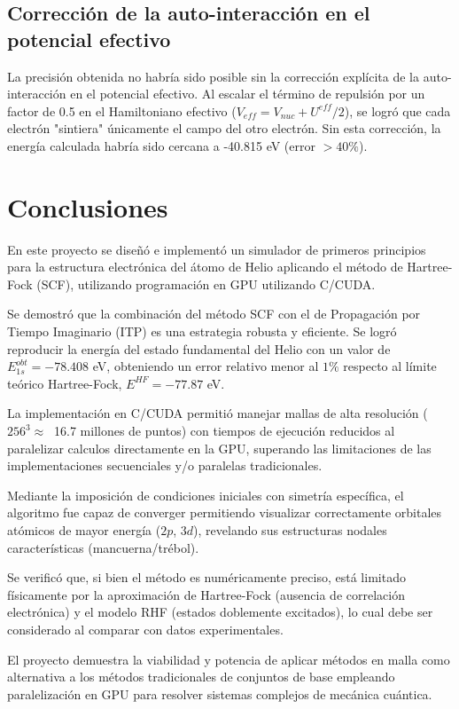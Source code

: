 \documentclass[aps,twocolumn,preprintnumbers]{revtex4}
\begin{document}
  \subsection{Corrección de la auto-interacción en el potencial efectivo}

  La precisión obtenida no habría sido posible sin la corrección explícita de la auto-interacción en el potencial efectivo. Al escalar el término de repulsión por un factor de 0.5 en el Hamiltoniano efectivo ($V_{eff}=V_{nuc} + U^{eff}/2$), se logró que cada electrón "sintiera" únicamente el campo del otro electrón. Sin esta corrección, la energía calculada habría sido cercana a -40.815 eV (error $> 40\%$).

  \section{Conclusiones}

  En este proyecto se diseñó e implementó un simulador de primeros principios para la estructura electrónica del átomo de Helio aplicando el método de Hartree-Fock (SCF), utilizando programación en GPU utilizando C/CUDA.

  Se demostró que la combinación del método SCF con el de Propagación por Tiempo Imaginario (ITP) es una estrategia robusta y eficiente. Se logró reproducir la energía del estado fundamental del Helio con un valor de $E^{obt}_{1s} = -78.408$ eV, obteniendo un error relativo menor al $1\%$ respecto al límite teórico Hartree-Fock, $E^{HF} = -77.87$ eV.

  La implementación en C/CUDA permitió manejar mallas de alta resolución ($256^3\approx\ $ 16.7 millones de puntos) con tiempos de ejecución reducidos al paralelizar calculos directamente en la GPU, superando las limitaciones de las implementaciones secuenciales y/o paralelas tradicionales.

  Mediante la imposición de condiciones iniciales con simetría específica, el algoritmo fue capaz de converger permitiendo visualizar correctamente orbitales atómicos de mayor energía ($2p$, $3d$), revelando sus estructuras nodales características (mancuerna/trébol).

  Se verificó que, si bien el método es numéricamente preciso, está limitado físicamente por la aproximación de Hartree-Fock (ausencia de correlación electrónica) y el modelo RHF (estados doblemente excitados), lo cual debe ser considerado al comparar con datos experimentales.

  El proyecto demuestra la viabilidad y potencia de aplicar métodos en malla como alternativa a los métodos tradicionales de conjuntos de base empleando paralelización en GPU para resolver sistemas complejos de mecánica cuántica.
\end{document}
